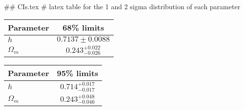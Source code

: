 ## CIs.tex
# latex table for the 1 and 2 sigma distribution of each parameter

\begin{tabular} { l  c}
 Parameter &  68\% limits\\
\hline
{\boldmath$h              $} & $0.7137\pm 0.0088          $\\
{\boldmath$\Omega_m       $} & $0.243^{+0.022}_{-0.026}   $\\
\hline
\end{tabular}

\begin{tabular} { l  c}
 Parameter &  95\% limits\\
\hline
{\boldmath$h              $} & $0.714^{+0.017}_{-0.017}   $\\
{\boldmath$\Omega_m       $} & $0.243^{+0.048}_{-0.046}   $\\
\hline
\end{tabular}
